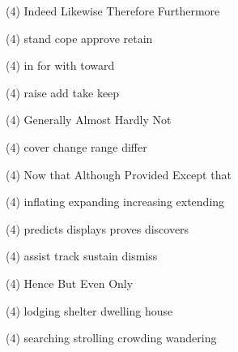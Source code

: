 \item
\begin{tasks}(4)
	\task Indeed
	\task Likewise
	\task Therefore
	\task Furthermore
\end{tasks}
\item
\begin{tasks}(4)
	\task stand
	\task cope
	\task approve
	\task retain
\end{tasks}
\item
\begin{tasks}(4)
	\task in
	\task for
	\task with
	\task toward
\end{tasks}
\item
\begin{tasks}(4)
	\task raise
	\task add
	\task take
	\task keep
\end{tasks}
\item
\begin{tasks}(4)
	\task Generally
	\task Almost
	\task Hardly
	\task Not
\end{tasks}
\item
\begin{tasks}(4)
	\task cover
	\task change
	\task range
	\task differ
\end{tasks}
\item
\begin{tasks}(4)
	\task Now that
	\task Although
	\task Provided
	\task Except that
\end{tasks}
\item
\begin{tasks}(4)
	\task inflating
	\task expanding
	\task increasing
	\task extending
\end{tasks}
\item
\begin{tasks}(4)
	\task predicts
	\task displays
	\task proves
	\task discovers
\end{tasks}
\item
\begin{tasks}(4)
	\task assist
	\task track
	\task sustain
	\task dismiss
\end{tasks}
\item
\begin{tasks}(4)
	\task Hence
	\task But
	\task Even
	\task Only
\end{tasks}
\item
\begin{tasks}(4)
	\task lodging
	\task shelter
	\task dwelling
	\task house
\end{tasks}
\item
\begin{tasks}(4)
	\task searching
	\task strolling
	\task crowding
	\task wandering
\end{tasks}
